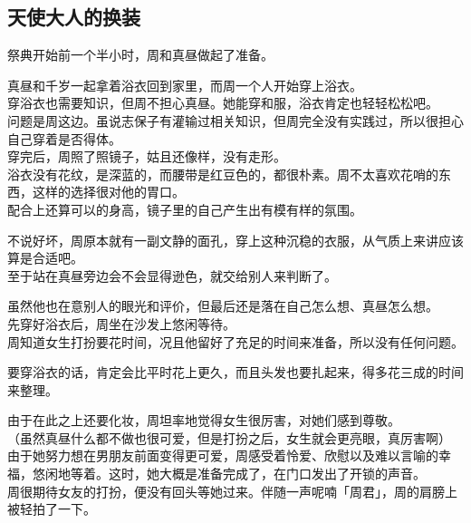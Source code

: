 \subsection{天使大人的换装}

祭典开始前一个半小时，周和真昼做起了准备。

真昼和千岁一起拿着浴衣回到家里，而周一个人开始穿上浴衣。\\

穿浴衣也需要知识，但周不担心真昼。她能穿和服，浴衣肯定也轻轻松松吧。\\

问题是周这边。虽说志保子有灌输过相关知识，但周完全没有实践过，所以很担心自己穿着是否得体。\\

穿完后，周照了照镜子，姑且还像样，没有走形。\\

浴衣没有花纹，是深蓝的，而腰带是红豆色的，都很朴素。周不太喜欢花哨的东西，这样的选择很对他的胃口。\\

配合上还算可以的身高，镜子里的自己产生出有模有样的氛围。

不说好坏，周原本就有一副文静的面孔，穿上这种沉稳的衣服，从气质上来讲应该算是合适吧。\\

至于站在真昼旁边会不会显得逊色，就交给别人来判断了。

虽然他也在意别人的眼光和评价，但最后还是落在自己怎么想、真昼怎么想。\\

先穿好浴衣后，周坐在沙发上悠闲等待。\\

周知道女生打扮要花时间，况且他留好了充足的时间来准备，所以没有任何问题。

要穿浴衣的话，肯定会比平时花上更久，而且头发也要扎起来，得多花三成的时间来整理。

由于在此之上还要化妆，周坦率地觉得女生很厉害，对她们感到尊敬。\\

（虽然真昼什么都不做也很可爱，但是打扮之后，女生就会更亮眼，真厉害啊）\\

由于她努力想在男朋友前面变得更可爱，周感受着怜爱、欣慰以及难以言喻的幸福，悠闲地等着。这时，她大概是准备完成了，在门口发出了开锁的声音。\\

周很期待女友的打扮，便没有回头等她过来。伴随一声呢喃「周君」，周的肩膀上被轻拍了一下。

